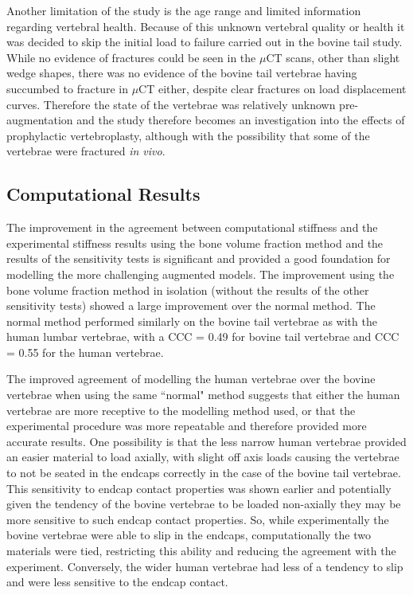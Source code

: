 Another limitation of the study is the age range and limited information
regarding vertebral health.  Because of this unknown vertebral quality or
health it was decided to skip the initial load to failure carried out in the
bovine tail study.  While no evidence of fractures could be seen in the $\mu$CT
scans, other than slight wedge shapes, there was no evidence of the bovine tail
vertebrae having succumbed to fracture in $\mu$CT either, despite clear
fractures on load displacement curves.  Therefore the state of the vertebrae
was relatively unknown pre-augmentation and the study therefore becomes an
investigation into the effects of prophylactic vertebroplasty, although with
the possibility that some of the vertebrae were fractured \textit{in vivo}.




\subsection{Computational Results}

The improvement in the agreement between computational stiffness and the
experimental stiffness results using the bone volume fraction method and the
results of the sensitivity tests is significant and provided a good foundation
for modelling the more challenging augmented models.  The improvement using the
bone volume fraction method in isolation (without the results of the other
sensitivity tests) showed a large improvement over the normal method.  The
normal method performed similarly on the bovine tail vertebrae as with the
human lumbar vertebrae, with a CCC = 0.49 for bovine tail vertebrae and CCC =
0.55 for the human vertebrae. 

The improved agreement of modelling the human vertebrae over the bovine
vertebrae when using the same ``normal" method suggests that either the human
vertebrae are more receptive to the modelling method used, or that the
experimental procedure was more repeatable and therefore provided more accurate
results. One possibility is that the less narrow human vertebrae provided an
easier material to load axially, with slight off axis loads causing the
vertebrae to not be seated in the endcaps correctly in the case of the bovine
tail vertebrae. This sensitivity to endcap contact properties was shown earlier
and potentially given the tendency of the bovine vertebrae to be loaded
non-axially they may be more sensitive to such endcap contact properties. So,
while experimentally the bovine vertebrae were able to slip in the endcaps,
computationally the two materials were tied, restricting this ability and
reducing the agreement with the experiment. Conversely, the wider human
vertebrae had less of a tendency to slip and were less sensitive to the endcap
contact.

